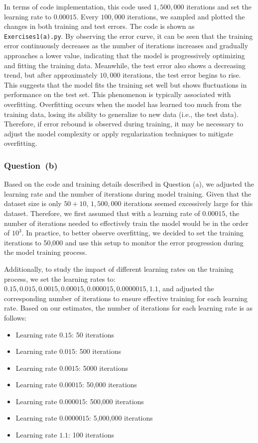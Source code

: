 \documentclass[a4paper, utf8]{ctexart}
\begin{document}
	In terms of code implementation, this code used $1,500,000$ iterations and set the learning rate to $0.00015$. Every $100,000$ iterations, we sampled and plotted the changes in both training and test errors. The code is shown as \verb|Exercises1(a).py|. By observing the error curve, it can be seen that the training error continuously decreases as the number of iterations increases and gradually approaches a lower value, indicating that the model is progressively optimizing and fitting the training data. Meanwhile, the test error also shows a decreasing trend, but after approximately $10,000$ iterations, the test error begins to rise. This suggests that the model fits the training set well but shows fluctuations in performance on the test set. This phenomenon is typically associated with overfitting. Overfitting occurs when the model has learned too much from the training data, losing its ability to generalize to new data (i.e., the test data). Therefore, if error rebound is observed during training, it may be necessary to adjust the model complexity or apply regularization techniques to mitigate overfitting.
	
	\subsubsection{Question\ (b)}
	
	Based on the code and training details described in Question (a), we adjusted the learning rate and the number of iterations during model training. Given that the dataset size is only $50 + 10$, $1,500,000$ iterations seemed excessively large for this dataset. Therefore, we first assumed that with a learning rate of $0.00015$, the number of iterations needed to effectively train the model would be in the order of $10^3$. In practice, to better observe overfitting, we decided to set the training iterations to 50,000 and use this setup to monitor the error progression during the model training process.
	
	Additionally, to study the impact of different learning rates on the training process, we set the learning rates to: $0.15, 0.015, 0.0015, 0.00015, 0.000015, 0.0000015, 1.1$, and adjusted the corresponding number of iterations to ensure effective training for each learning rate. Based on our estimates, the number of iterations for each learning rate is as follows:
	
	\begin{itemize}[itemsep=2pt, topsep=0pt, parsep=0pt]
	    \item Learning rate $0.15$: 50 iterations
	    \item Learning rate $0.015$: 500 iterations
	    \item Learning rate $0.0015$: 5000 iterations
	    \item Learning rate $0.00015$: 50,000 iterations
	    \item Learning rate $0.000015$: 500,000 iterations
	    \item Learning rate $0.0000015$: 5,000,000 iterations
	    \item Learning rate $1.1$: 100 iterations
	\end{itemize}
	
\end{document}
